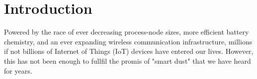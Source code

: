 \chapter{Introduction}
\label{chp:introduction}

Powered by the race of ever decreasing process-node sizes, more efficient battery chemistry, and an ever expanding wireless communication infrastructure, millions if not billions of Internet of Things (IoT) devices have entered our lives.
However, this has not been enough to fullfil the promis of "smart dust" that we have heard for years. 
